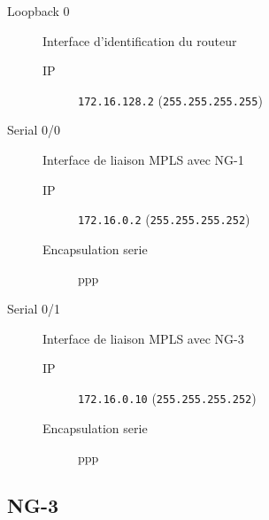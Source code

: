 	\begin{description}
		\item[Loopback 0] Interface d'identification du routeur
		\begin{description}
			\item[IP] \texttt{172.16.128.2} (\texttt{255.255.255.255})
		\end{description}

		\item[Serial 0/0] Interface de liaison MPLS avec NG-1
		\begin{description}
			\item[IP] \texttt{172.16.0.2} (\texttt{255.255.255.252})
			\item[Encapsulation serie] ppp
		\end{description}

		\item[Serial 0/1] Interface de liaison MPLS avec NG-3
		\begin{description}
			\item[IP] \texttt{172.16.0.10} (\texttt{255.255.255.252})
			\item[Encapsulation serie] ppp
		\end{description}

	\end{description}
\subsection{NG-3}

